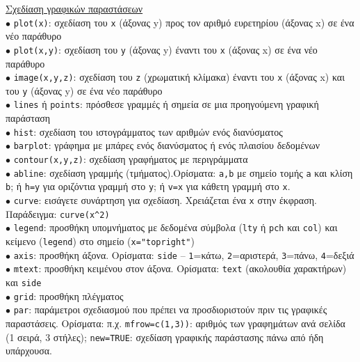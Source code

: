\documentclass[a4paper,10pt,twocolumn]{article}
\begin{document}
\noindent \underline{Σχεδίαση γραφικών παραστάσεων}\vspace{0.2cm}\\
$\bullet$ \texttt{plot(x)}: σχεδίαση του \texttt{x} (άξονας y) προς τον αριθμό ευρετηρίου (άξονας x) σε ένα 
νέο παράθυρο\\
$\bullet$ \texttt{plot(x,y)}: σχεδίαση του \texttt{y} (άξονας y) έναντι του \texttt{x} (άξονας x) σε ένα νέο
παράθυρο\\
$\bullet$ \texttt{image(x,y,z)}: σχεδίαση του \texttt{z} (χρωματική κλίμακα) έναντι του \texttt{x} (άξονας x)
και του \texttt{y} (άξονας y) σε ένα νέο παράθυρο\\
$\bullet$ \texttt{lines} ή \texttt{points}: πρόσθεσε γραμμές ή σημεία σε μια προηγούμενη γραφική παράσταση\\
$\bullet$ \texttt{hist}: σχεδίαση του ιστογράμματος των αριθμών ενός διανύσματος\\
$\bullet$ \texttt{barplot}: γράφημα με μπάρες ενός διανύσματος ή ενός πλαισίου δεδομένων\\
$\bullet$ \texttt{contour(x,y,z)}: σχεδίαση γραφήματος με περιγράμματα \\
$\bullet$ \texttt{abline}: σχεδίαση γραμμής (τμήματος).Ορίσματα: \texttt{a,b} με σημείο τομής \texttt{a} και
κλίση \texttt{b}; ή \texttt{h=y} για οριζόντια γραμμή στο \texttt{y}; ή \texttt{v=x} για κάθετη γραμμή στο
\texttt{x}.\\
$\bullet$ \texttt{curve}: εισάγετε συνάρτηση για σχεδίαση. Χρειάζεται ένα \texttt{x} στην έκφραση. Παράδειγμα:
\verb!curve(x^2)! \\
$\bullet$ \texttt{legend}: προσθήκη υπομνήματος με δεδομένα σύμβολα (\texttt{lty} ή \texttt{pch} και
\texttt{col}) και κείμενο (\texttt{legend}) στο σημείο (\texttt{x="topright"})\\
$\bullet$ \texttt{axis}: προσθήκη άξονα. Ορίσματα: \texttt{side} -- \texttt{1}=κάτω, \texttt{2}=αριστερά,
\texttt{3}=πάνω, \texttt{4}=δεξιά\\
$\bullet$ \texttt{mtext}: προσθήκη κειμένου στον άξονα. Ορίσματα: \texttt{text} (ακολουθία χαρακτήρων) και
\texttt{side}\\
$\bullet$ \texttt{grid}: προσθήκη πλέγματος\\
$\bullet$ \texttt{par}: παράμετροι σχεδιασμού που πρέπει να προσδιοριστούν πριν τις γραφικές παραστάσεις. 
Ορίσματα: π.χ. \texttt{mfrow=c(1,3))}: αριθμός των γραφημάτων ανά σελίδα (1 σειρά, 3 στήλες); \texttt{new=TRUE}:
σχεδίαση γραφικής παράστασης πάνω από ήδη υπάρχουσα.\\
\end{document}
